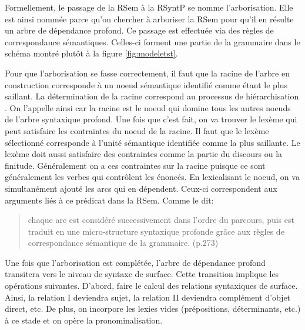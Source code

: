 Formellement, le passage de la RSem à la RSyntP se nomme l'arborisation. Elle est ainsi nommée  parce qu'on chercher à arboriser la RSem pour qu'il en résulte un arbre de dépendance profond. Ce passage est effectuée via des règles de correspondance sémantiques. Celles-ci forment une partie de la grammaire dans le schéma montré plutôt à la figure \ref{fig:modeletst}.

Pour que l'arborisation se fasse correctement, il faut que la racine de l'arbre en construction corresponde à un noeud sémantique identifié comme étant le plus saillant. La détermination de la racine correspond au processus de hiérarchisation \citep{PolguereStructurationmisejeu1990}. On l'appelle ainsi car la racine est le noeud qui domine tous les autres noeuds de l'arbre syntaxique profond. Une fois que c'est fait, on va trouver le lexème qui peut satisfaire les contraintes du noeud de la racine. Il faut que le lexème sélectionné corresponde à l'unité sémantique identifiée comme la plus saillante. Le lexème doit aussi satisfaire des contraintes comme la partie du discours ou la finitude. Généralement on a ces contraintes sur la racine puisque ce sont généralement les verbes qui contrôlent les énoncés. En lexicalisant le noeud, on va simultanément ajouté les arcs qui en dépendent. Ceux-ci correspondent aux arguments liés à ce prédicat dans la RSem. Comme \cite{PolguereStructurationmisejeu1990} le dit:
\begin{quotation} chaque arc est considéré successivement dans l'ordre du parcours, puis est traduit en une micro-structure syntaxique profonde grâce aux règles de correspondance sémantique de la grammaire. (p.273)
\end{quotation}

Une fois que l'arborisation est complétée, l'arbre de dépendance profond transitera vers le niveau de syntaxe de surface. Cette transition implique les opérations suivantes. D'abord, faire le calcul des relations syntaxiques de surface. Ainsi, la relation I deviendra sujet, la relation II deviendra complément d'objet direct, etc. De plus, on incorpore les lexies vides (prépositions, déterminants, etc.) à ce stade et on opère la pronominalisation. 

